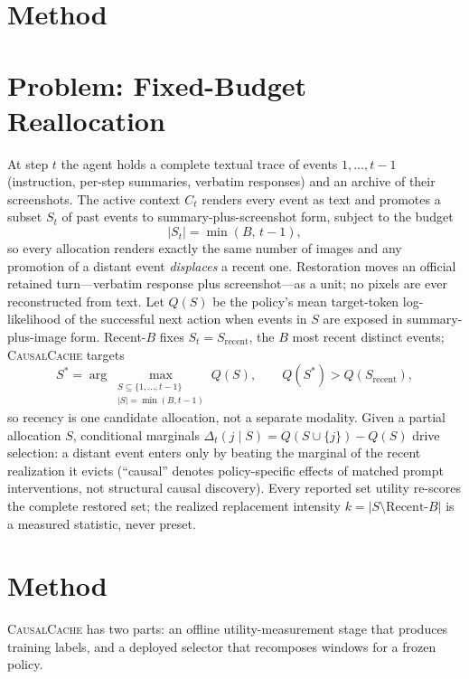 \documentclass[letterpaper]{article} %
\newcommand{\method}{\textsc{CausalCache}}
\newcommand{\ctx}[1]{C_{#1}}
\begin{document}
\section{Method}

\section{Problem: Fixed-Budget Reallocation}

At step $t$ the agent holds a complete textual trace of events
$1,\dots,t{-}1$ (instruction, per-step summaries, verbatim responses) and
an archive of their screenshots. The active context $\ctx{t}$ renders
every event as text and promotes a subset $S_t$ of past events to
summary-plus-screenshot form, subject to the budget
\begin{equation}
|S_t| = \min(B,\, t-1),
\label{eq:budget}
\end{equation}
so every allocation renders exactly the same number of images and any
promotion of a distant event \emph{displaces} a recent one. Restoration
moves an official retained turn---verbatim response plus screenshot---as a
unit; no pixels are ever reconstructed from text. Let $Q(S)$ be the
policy's mean target-token log-likelihood of the successful next action
when events in $S$ are exposed in summary-plus-image form. Recent-$B$
fixes $S_t{=}S_{\mathrm{recent}}$, the $B$ most recent distinct events;
\method{} targets
\begin{equation}
S^{*}=\arg\max_{\substack{S\subseteq\{1,\ldots,t-1\}\\ |S|=\min(B,t-1)}} Q(S),
\qquad
Q(S^{*})>Q(S_{\mathrm{recent}}),
\label{eq:decision}
\end{equation}
so recency is one candidate allocation, not a separate modality. Given a
partial allocation $S$, conditional marginals
$\Delta_t(j\mid S)=Q(S\cup\{j\})-Q(S)$ drive selection: a distant event
enters only by beating the marginal of the recent realization it evicts
(``causal'' denotes policy-specific effects of matched prompt
interventions, not structural causal discovery). Every reported set
utility re-scores the complete restored set; the realized replacement
intensity $k=|S\setminus\mathrm{Recent}\text{-}B|$ is a measured
statistic, never preset.

\section{Method}

\method{} has two parts: an offline utility-measurement stage that
produces training labels, and a deployed selector that recomposes windows
for a frozen policy.
\end{document}
